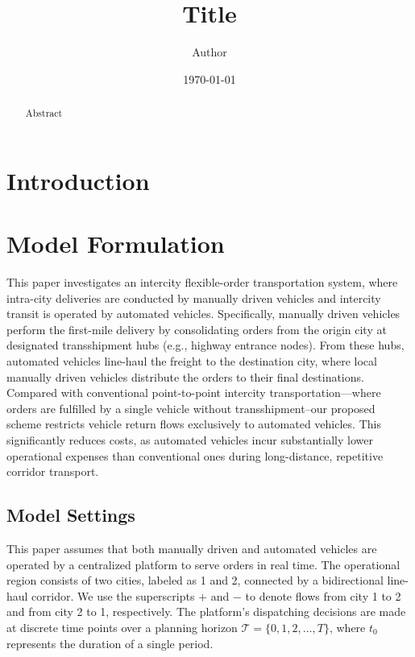 \documentclass[10pt, reqno]{amsart}
\begin{document}
\title{Title} %
\author[Initial Surname]{Author}
\date{\today}
\address{Address}
\maketitle

\let\thefootnote\relax
{} %

\begin{abstract}
Abstract 
\end{abstract} %

\bigskip
\section{Introduction}

\section{Model Formulation}
This paper investigates an intercity flexible-order transportation system, where intra-city deliveries are conducted by manually driven vehicles and intercity transit is operated by automated vehicles. Specifically, manually driven vehicles perform the first-mile delivery by consolidating orders from the origin city at designated transshipment hubs (e.g., highway entrance nodes). From these hubs, automated vehicles line-haul the freight to the destination city, where local manually driven vehicles distribute the orders to their final destinations. Compared with conventional point-to-point intercity transportation—where orders are fulfilled by a single vehicle without transshipment--our proposed scheme restricts vehicle return flows exclusively to automated vehicles. This significantly reduces costs, as automated vehicles incur substantially lower operational expenses than conventional ones during long-distance, repetitive corridor transport. 

\subsection{Model Settings} \label{subsec:settings}

This paper assumes that both manually driven and automated vehicles are operated by a centralized platform to serve orders in real time. The operational region consists of two cities, labeled as 1 and 2, connected by a bidirectional line-haul corridor. We use the superscripts $+$ and $-$ to denote flows from city 1 to 2 and from city 2 to 1, respectively. The platform's dispatching decisions are made at discrete time points over a planning horizon $\mathcal{T} = \{0, 1, 2, \dots, T\}$, where $t_0$ represents the duration of a single period.
\end{document}
